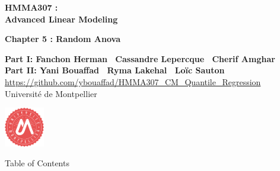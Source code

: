 \documentclass[unknownkeysallowed]{beamer}
\begin{document}



\begin{frame}
\bigskip
\bigskip
\begin{center}{
\LARGE\color{marron}
\textbf{HMMA307 : \\ Advanced Linear Modeling}
\textbf{ }\\
\vspace{0.5cm}
}

\color{marron}
\textbf{Chapter 5 : Random Anova}
\end{center}
\vspace{0.5cm}

\begin{center}
\textbf{Part I: Fanchon Herman \ Cassandre Lepercque \ Cherif Amghar} \\
\textbf{Part II: Yani Bouaffad \ Ryma Lakehal \ Loïc Sauton}\\
\vspace{0.1cm}
\url{https://github.com/ybouaffad/HMMA307_CM_Quantile_Regression}\\
\vspace{0.3cm}
Université de Montpellier \\
\end{center}

\centering
\includegraphics[width=0.13\textwidth]{Logo}

\end{frame}






\begin{frame}{Table of Contents}
\tableofcontents[hideallsubsections]
\end{frame}
\end{document}
